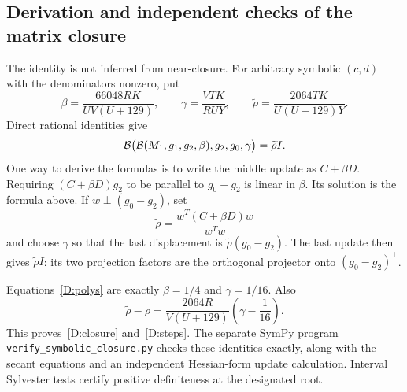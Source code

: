 \documentclass[10pt,oneside,openany]{book}
\theoremstyle{remark}\newtheorem{remark}{Remark}[chapter]
\begin{document}
\subsection{Derivation and independent checks of the matrix closure}
The identity is not inferred from near-closure. For arbitrary symbolic $(c,d)$ with the denominators nonzero, put
\[
 \beta=\frac{66048RK}{UV(U+129)},\qquad
 \gamma=\frac{VTK}{RUY},\qquad
 \widetilde\rho=\frac{2064TK}{U(U+129)Y}.
\]
Direct rational identities give
\[
 \mathcal B\bigl(\mathcal B(M_1,g_1,g_2,\beta),g_2,g_0,\gamma\bigr)
 =\widetilde\rho I.
\]
One way to derive the formulas is to write the middle update as $C+\beta D$. Requiring $(C+\beta D)g_2$ to be parallel to $g_0-g_2$ is linear in $\beta$. Its solution is the formula above. If $w\perp(g_0-g_2)$, set
\[
 \widetilde\rho=\frac{w^T(C+\beta D)w}{w^Tw}
\]
and choose $\gamma$ so that the last displacement is $\widetilde\rho(g_0-g_2)$. The last update then gives $\widetilde\rho I$: its two projection factors are the orthogonal projector onto $(g_0-g_2)^\perp$.

Equations~\eqref{D:polys} are exactly $\beta=1/4$ and $\gamma=1/16$. Also
\[
 \widetilde\rho-\rho
 =\frac{2064R}{V(U+129)}\left(\gamma-\frac1{16}\right).
\]
This proves~\eqref{D:closure} and~\eqref{D:steps}. The separate SymPy program \texttt{verify\_symbolic\_closure.py} checks these identities exactly, along with the secant equations and an independent Hessian-form update calculation. Interval Sylvester tests certify positive definiteness at the designated root.


\setcounter{section}{2}
\setcounter{theorem}{1}
\setcounter{lemma}{1}
\setcounter{corollary}{0}
\setcounter{proposition}{0}
\setcounter{remark}{0}
\setcounter{equation}{6}
\end{document}
